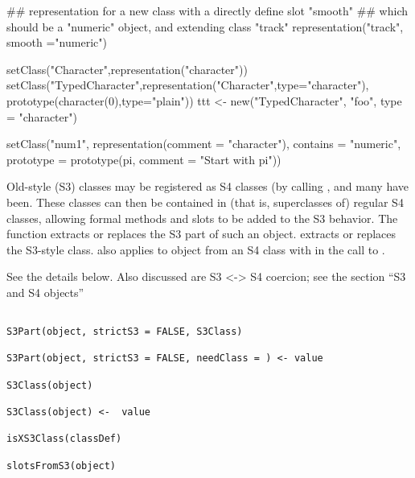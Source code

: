 %
\begin{SeeAlso}\relax
\end{SeeAlso}
%
\begin{Examples}
\begin{ExampleCode}
## representation for a new class with a directly define slot "smooth"
## which should be a "numeric" object, and extending class "track"
representation("track", smooth ="numeric")


setClass("Character",representation("character"))
setClass("TypedCharacter",representation("Character",type="character"),
          prototype(character(0),type="plain"))
ttt <- new("TypedCharacter", "foo", type = "character")


setClass("num1", representation(comment = "character"),
         contains = "numeric",
         prototype = prototype(pi, comment = "Start with pi"))



\end{ExampleCode}
\end{Examples}
%
\begin{Description}\relax
Old-style (S3) classes may be registered as S4 classes (by calling
, and many have been.  These classes can
then be contained in (that is, superclasses of) regular S4 classes, allowing formal methods
and slots to be added to the S3 behavior.  The function
 extracts or replaces 
the S3 part of such an object.
 extracts or
replaces the S3-style class.   also applies to object
from an S4 class with  in the call to .

See the details below.
Also discussed are S3 <-> S4 coercion; see the section
``S3 and S4 objects''
\end{Description}
%
\begin{Usage}
\begin{verbatim}

S3Part(object, strictS3 = FALSE, S3Class)

S3Part(object, strictS3 = FALSE, needClass = ) <- value

S3Class(object)

S3Class(object) <-  value

isXS3Class(classDef)

slotsFromS3(object)

\end{verbatim}
\end{Usage}
